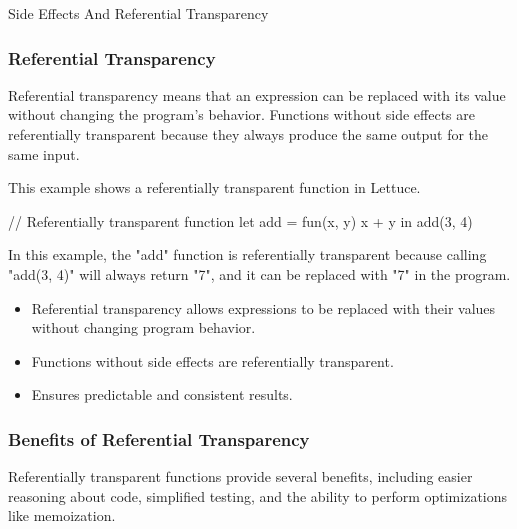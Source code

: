 \begin{notes}{Side Effects And Referential Transparency}
\begin{highlight}
    \end{highlight}
    
    \subsubsection*{Referential Transparency}
    
    Referential transparency means that an expression can be replaced with its value without changing the program's behavior. Functions without side effects are referentially transparent because they 
    always produce the same output for the same input.
    
    \begin{highlight}
    
        This example shows a referentially transparent function in Lettuce.
    
    \begin{code}[Lettuce]
    // Referentially transparent function
    let add = fun(x, y) {
        x + y
    } in
    add(3, 4)
    \end{code}
    
        In this example, the "add" function is referentially transparent because calling "add(3, 4)" will always return "7", and it can be replaced with "7" in the program.
    
        \begin{itemize}
            \item Referential transparency allows expressions to be replaced with their values without changing program behavior.
            \item Functions without side effects are referentially transparent.
            \item Ensures predictable and consistent results.
        \end{itemize}
    
    \end{highlight}
    
    \subsubsection*{Benefits of Referential Transparency}
    
    Referentially transparent functions provide several benefits, including easier reasoning about code, simplified testing, and the ability to perform optimizations like memoization.
    
    \begin{highlight}
    

\end{highlight}
\end{notes}
